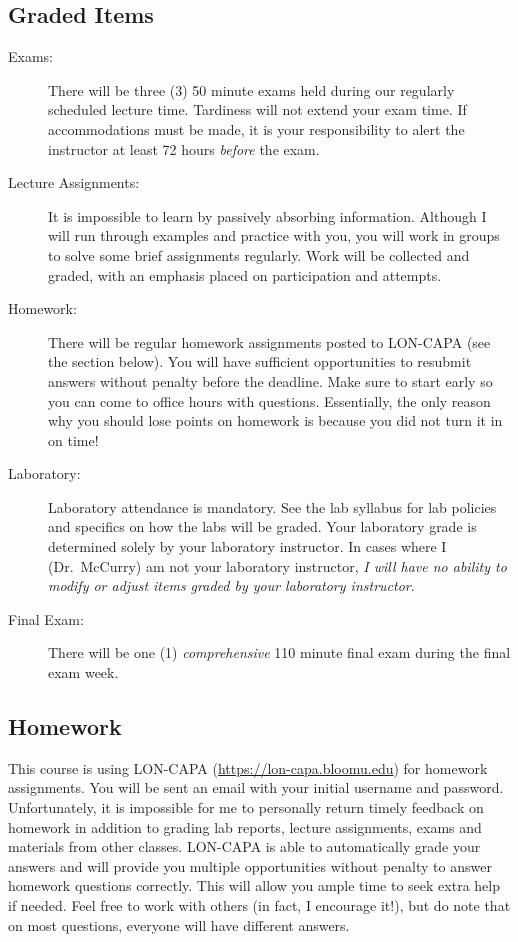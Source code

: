 \documentclass[11pt,letterpaper]{article}
\begin{document}
\subsection{Graded Items}
\begin{description}
	\item[Exams:] There will be three (3) 50 minute exams held during our
		regularly scheduled lecture time. Tardiness will not extend your
		exam time. If accommodations must be made, it is your
		responsibility to alert the instructor at least 72 hours
		\emph{before} the exam.
	\item[Lecture Assignments:] It is impossible to learn by passively
		absorbing information. Although I will run through examples and
		practice with you, you will work in groups to solve some brief
		assignments regularly. Work will be collected and graded, with
		an emphasis placed on participation and attempts.
	\item[Homework:] There will be regular homework assignments posted to
		LON-CAPA (see the  section below). You will have sufficient
		opportunities to resubmit answers without penalty before the
		deadline. Make sure to start early so you can come to office
		hours with questions. Essentially, the only reason why you
		should lose points on homework is because you did not turn it in
		on time!
	\item[Laboratory:] Laboratory attendance is mandatory. See the lab
		syllabus for lab policies and specifics on how the labs will be
		graded. Your laboratory grade is determined solely by your
		laboratory instructor. In cases where I (Dr.\ McCurry) am not
		your laboratory instructor, \emph{I will have no ability to
		modify or adjust items graded by your laboratory instructor}.
	\item[Final Exam:] There will be one (1) \emph{comprehensive} 110 minute
		final exam during the final exam week. 
\end{description}

\subsection{Homework}\label{homework}
This course is using LON-CAPA (\url{https://lon-capa.bloomu.edu}) for homework
assignments. You will be sent an email with your initial username and password.
Unfortunately, it is impossible for me to personally return timely feedback on
homework in addition to grading lab reports, lecture assignments, exams and
materials from other classes. LON-CAPA is able to automatically grade your
answers and will provide you multiple opportunities without penalty to answer
homework questions correctly. This will allow you ample time to seek extra help
if needed. Feel free to work with others (in fact, I encourage it!), but do note
that on most questions, everyone will have different answers.
\end{document}

